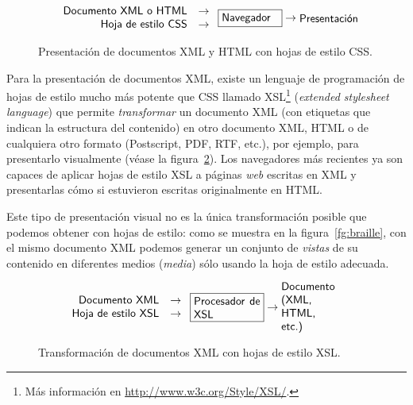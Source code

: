 {\begin{figure} $$ \left. \begin{array}{rcl} \mbox{\textsf{Documento XML o HTML}} &\to \\ \mbox{\textsf{Hoja de estilo CSS}} &\to \\ \end{array} \right. \mbox{\framebox{\parbox{1.8cm}{\textsf{Navegador}}}} \to \mbox{\parbox{1.8cm}{\textsf{Presentación}}} $$ \caption{Presentación de documentos XML y HTML con hojas de estilo CSS.} \label{fg:CSS} \end{figure} 

Para la presentación de documentos XML, existe un lenguaje de programación de hojas de estilo mucho más potente que CSS llamado XSL\footnote{Más información en \url{http://www.w3c.org/Style/XSL/}.} (\emph{extended stylesheet language}) que permite \emph{transformar} un documento XML (con etiquetas que  indican la estructura del contenido) en otro documento XML, HTML o de cualquiera otro formato (Postscript, PDF, RTF, etc.), por ejemplo, para presentarlo visualmente (véase la figura~\ref{fg:XSL}). Los navegadores más recientes ya son capaces de aplicar hojas de estilo XSL a páginas \emph{web} escritas en XML y presentarlas cómo si estuvieron escritas originalmente en HTML. 

Este tipo de presentación visual no es la única transformación posible que podemos obtener con hojas de estilo: como se muestra en la figura~\ref{fg:braille}, con el mismo documento XML podemos generar un conjunto de \emph{vistas} de su contenido en diferentes medios (\emph{media}) sólo usando la hoja de estilo adecuada. 

\begin{figure} $$ \left. \begin{array}{rcl} \mbox{\textsf{Documento XML}} &\to \\ \mbox{\textsf{Hoja de estilo XSL}} &\to \\ \end{array} \right. \mbox{\framebox{\parbox{2.1cm}{\textsf{Procesador de XSL}}}} \to \mbox{\parbox{2.1cm}{\textsf{Documento (XML, HTML, etc.) }}} $$ \caption{Transformación de documentos XML con hojas de estilo XSL.} \label{fg:XSL} \end{figure} 

}
